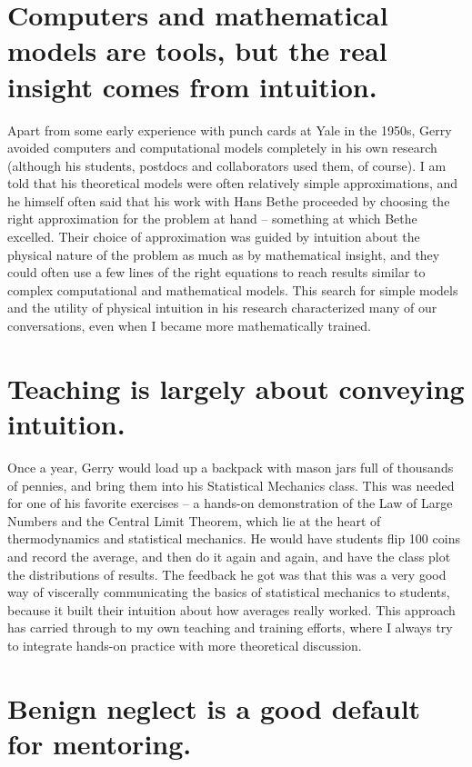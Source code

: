 \documentclass{ws-rv9x6}
\begin{document}
\section*{Computers and mathematical models are tools, but the real insight
comes from intuition.}

Apart from some early experience with punch cards at Yale in the
1950s, Gerry avoided computers and computational models completely in
his own research (although his students, postdocs and collaborators
used them, of course). I am told that his theoretical models were
often relatively simple approximations, and he himself often said that
his work with Hans Bethe proceeded by choosing the right approximation
for the problem at hand -- something at which Bethe excelled. Their
choice of approximation was guided by intuition about the physical
nature of the problem as much as by mathematical insight, and they
could often use a few lines of the right equations to reach results
similar to complex computational and mathematical models. This search
for simple models and the utility of physical intuition in his
research characterized many of our conversations, even when I became
more mathematically trained.

\section*{Teaching is largely about conveying intuition.}

Once a year, Gerry would load up a backpack with mason jars full of
thousands of pennies, and bring them into his Statistical Mechanics
class. This was needed for one of his favorite exercises -- a hands-on
demonstration of the Law of Large Numbers and the Central Limit
Theorem, which lie at the heart of thermodynamics and statistical
mechanics. He would have students flip 100 coins and record the
average, and then do it again and again, and have the class plot the
distributions of results. The feedback he got was that this was a very
good way of viscerally communicating the basics of statistical
mechanics to students, because it built their intuition about how
averages really worked. This approach has carried through to my own
teaching and training efforts, where I always try to integrate
hands-on practice with more theoretical discussion.

\section*{Benign neglect is a good default for mentoring.}
\end{document}
